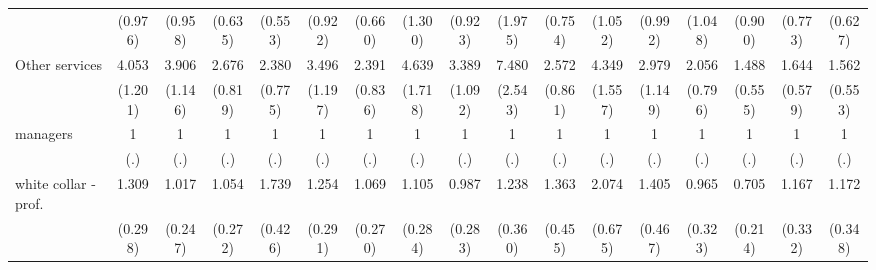{\begin{tabular}{l*{16}{c}}
                    &     (0.976)         &     (0.958)         &     (0.635)         &     (0.553)         &     (0.922)         &     (0.660)         &     (1.300)         &     (0.923)         &     (1.975)         &     (0.754)         &     (1.052)         &     (0.992)         &     (1.048)         &     (0.900)         &     (0.773)         &     (0.627)         \\
[1em]
Other services      &       4.053\sym{***}&       3.906\sym{***}&       2.676\sym{**} &       2.380\sym{**} &       3.496\sym{***}&       2.391\sym{*}  &       4.639\sym{***}&       3.389\sym{***}&       7.480\sym{***}&       2.572\sym{**} &       4.349\sym{***}&       2.979\sym{**} &       2.056         &       1.488         &       1.644         &       1.562         \\
                    &     (1.201)         &     (1.146)         &     (0.819)         &     (0.775)         &     (1.197)         &     (0.836)         &     (1.718)         &     (1.092)         &     (2.543)         &     (0.861)         &     (1.557)         &     (1.149)         &     (0.796)         &     (0.555)         &     (0.579)         &     (0.553)         \\
[1em]
managers            &           1         &           1         &           1         &           1         &           1         &           1         &           1         &           1         &           1         &           1         &           1         &           1         &           1         &           1         &           1         &           1         \\
                    &         (.)         &         (.)         &         (.)         &         (.)         &         (.)         &         (.)         &         (.)         &         (.)         &         (.)         &         (.)         &         (.)         &         (.)         &         (.)         &         (.)         &         (.)         &         (.)         \\
[1em]
white collar - prof.&       1.309         &       1.017         &       1.054         &       1.739\sym{*}  &       1.254         &       1.069         &       1.105         &       0.987         &       1.238         &       1.363         &       2.074\sym{*}  &       1.405         &       0.965         &       0.705         &       1.167         &       1.172         \\
                    &     (0.298)         &     (0.247)         &     (0.272)         &     (0.426)         &     (0.291)         &     (0.270)         &     (0.284)         &     (0.283)         &     (0.360)         &     (0.455)         &     (0.675)         &     (0.467)         &     (0.323)         &     (0.214)         &     (0.332)         &     (0.348)         \\

\end{tabular}}
